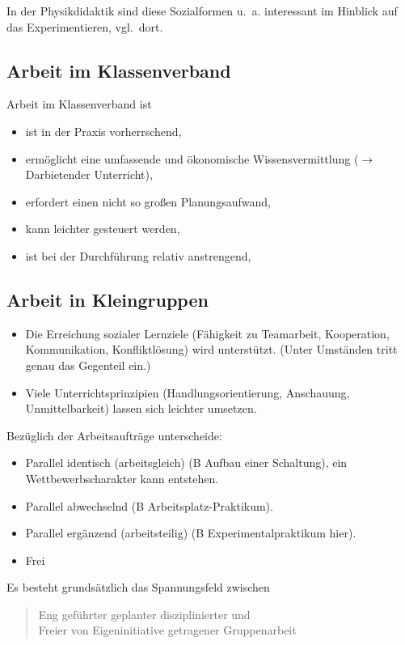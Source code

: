 In der Physikdidaktik sind  diese Sozialformen u.~a. interessant
im Hinblick auf das Experimentieren, vgl.\ dort.


\subsection{Arbeit im Klassenverband}

Arbeit im Klassenverband ist
\begin{itemize}
\item ist in der Praxis vorherrschend,
\item erm\"{o}glicht eine umfassende und \"{o}konomische
Wissensvermittlung ($\to$ Darbietender Unterricht),
\item erfordert einen nicht so gro{\ss}en Planungsaufwand,
\item kann leichter gesteuert werden,
\item ist bei der Durchf\"{u}hrung relativ anstrengend,
\end{itemize}



\subsection{Arbeit in Kleingruppen}

\begin{itemize}
\item Die Erreichung sozialer Lernziele
(F\"{a}higkeit zu Teamarbeit, Kooperation,
Kommunikation, Konfliktl\"{o}sung) wird unterst\"{u}tzt.
(Unter Umst\"{a}nden tritt genau das Gegenteil ein.)
\item Viele Unterrichtsprinzipien (Handlungsorientierung,
Anschauung, Unmittelbarkeit) lassen sich leichter umsetzen.
\end{itemize}

Bez\"{u}glich der Arbeitsauftr\"{a}ge unterscheide:
\begin{itemize}
\item
Parallel identisch (arbeitsgleich) (B Aufbau einer Schaltung), ein
Wettbewerbscharakter kann entstehen.
\item
Parallel abwechselnd (B Arbeitsplatz-Praktikum).
\item
Parallel erg\"{a}nzend (arbeitsteilig) (B Experimentalpraktikum hier).
\item
Frei
\end{itemize}

Es besteht grunds\"{a}tzlich das Spannungsfeld zwischen
\begin{quote}
Eng gef\"{u}hrter geplanter disziplinierter \q und \\
Freier von Eigeninitiative getragener Gruppenarbeit
\end{quote}


